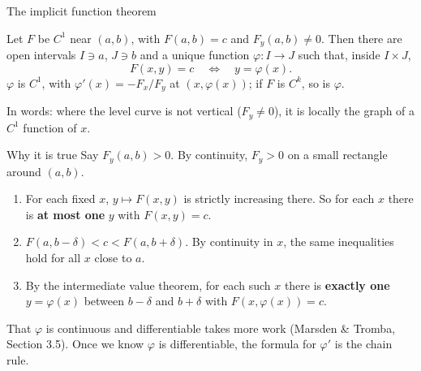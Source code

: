 \documentclass[10pt]{wosm-slides}
\begin{document}
\begin{frame}{The implicit function theorem}
  \begin{theorem}
    Let $F$ be $C^1$ near $(a, b)$, with $F(a, b) = c$ and $F_y(a, b) \ne 0$. Then there are open
    intervals $I \ni a$, $J \ni b$ and a unique function $\varphi\colon I \to J$ such that, inside
    $I \times J$,
    \[ F(x, y) = c \quad\iff\quad y = \varphi(x) . \]
    $\varphi$ is $C^1$, with $\varphi'(x) = -F_x / F_y$ at $(x, \varphi(x))$; if $F$ is $C^k$, so is $\varphi$.
  \end{theorem}
  \pause
  {\small In words: where the level curve is not vertical ($F_y \ne 0$), it is locally the graph of a
  $C^1$ function of $x$.\par}
\end{frame}

\begin{frame}{Why it is true}
  Say $F_y(a, b) > 0$. By continuity, $F_y > 0$ on a small rectangle around $(a, b)$.
  \pause
  \begin{enumerate}
    \item For each fixed $x$, $y \mapsto F(x, y)$ is strictly increasing there. So for each $x$ there
      is \textbf{at most one} $y$ with $F(x, y) = c$.
    \pause
    \item $F(a, b - \delta) < c < F(a, b + \delta)$. By continuity in $x$, the same inequalities hold for
      all $x$ close to $a$.
    \pause
    \item By the intermediate value theorem, for each such $x$ there is \textbf{exactly one}
      $y = \varphi(x)$ between $b - \delta$ and $b + \delta$ with $F(x, \varphi(x)) = c$.
  \end{enumerate}
  \pause
  {\small That $\varphi$ is continuous and differentiable takes more work (Marsden \& Tromba, Section 3.5).
  Once we know $\varphi$ is differentiable, the formula for $\varphi'$ is the chain rule.\par}
\end{frame}
\end{document}
